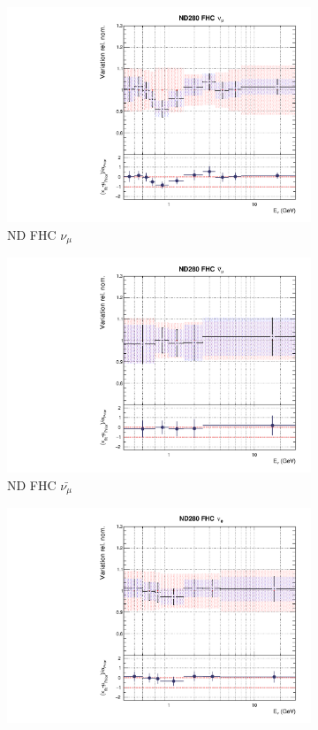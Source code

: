 \begin{figure}[t]
\begin{subfigure}{0.3\textwidth}
\end{subfigure}
\begin{subfigure}{0.42\textwidth}
  \centering
  \includegraphics[width=0.75\linewidth]{figs/rhcmpdat248flux_0}
  \caption{ND FHC $\nu_{\mu}$}
\end{subfigure}
\begin{subfigure}{0.42\textwidth}
  \centering
  \includegraphics[width=0.75\linewidth]{figs/rhcmpdat248flux_1}
  \caption{ND FHC $\bar{\nu_{\mu}}$}
\end{subfigure}
\begin{subfigure}{0.42\textwidth}
  \centering
  \includegraphics[width=0.75\linewidth]{figs/rhcmpdat248flux_2}

\end{subfigure}
\end{figure}
